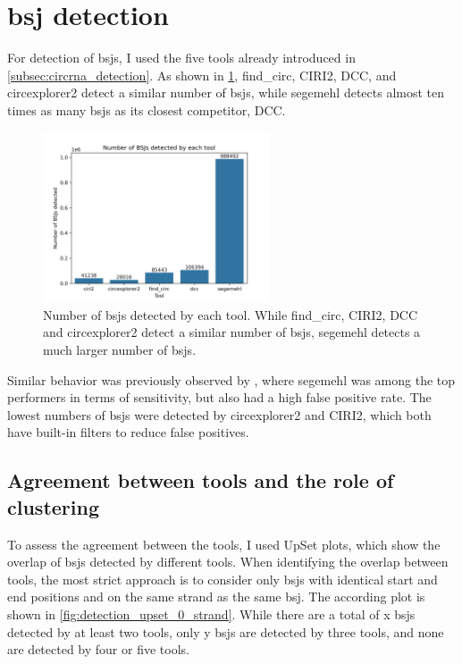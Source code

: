 \section{\Acrfull{bsj} detection}

For detection of \gls{bsj}s, I used the five tools already introduced in
\cref{subsec:circrna_detection}.
As shown in \cref{fig:detection_bars}, find\_circ, CIRI2, DCC, and
circexplorer2 detect a similar number of \gls{bsj}s, while segemehl detects
almost ten times as many \gls{bsj}s as its closest competitor, DCC.

\begin{figure}[ht] \centering

    \includegraphics[width=0.6\textwidth]{chapters/4_results_and_discussion/figures/detection/n_bsjs_detected.png}
    \caption{Number of \gls{bsj}s detected by each tool.
        While find\_circ, CIRI2, DCC and circexplorer2 detect a similar number of
        \gls{bsj}s, segemehl detects a much larger number of \gls{bsj}s.
    }
    \label{fig:detection_bars}
\end{figure}
Similar behavior was previously observed by \textcite{zeng_comprehensive_2017},
where segemehl was among the top performers in terms of sensitivity, but also
had a high false positive rate.
The lowest numbers of \gls{bsj}s were detected by circexplorer2 and CIRI2,
which both have built-in filters to reduce false
positives\supercite{zhang_diverse_2016,gao_circular_2018}.

\subsection{Agreement between tools and the role of clustering}


To assess the agreement between the tools, I used UpSet plots, which show the
overlap of \gls{bsj}s detected by different tools.
When identifying the overlap between tools, the most strict approach is to
consider only \gls{bsj}s with identical start and end positions and on the same
strand as the same \gls{bsj}.
The according plot is shown in \cref{fig:detection_upset_0_strand}.
While there are a total of x \gls{bsj}s detected by at least two tools, only y
\gls{bsj}s are detected by three tools, and none are detected by four or five
tools.


